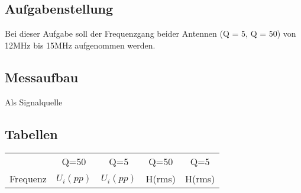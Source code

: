 \documentclass[12pt,a4paper,ngerman]{article}
\begin{document}
\subsection{Aufgabenstellung}
Bei dieser Aufgabe soll der Frequenzgang beider Antennen (Q = 5, Q = 50) von 12MHz bis 15MHz aufgenommen werden.\\

\subsection{Messaufbau}
Als Signalquelle 

\subsection{Tabellen}
\begin{table}[H]
\begin{center}
\begin{tabular}{ |c|c|c|c|c| }
  \hline
     & Q=50 & Q=5 & Q=50 & Q=5\\

    Frequenz & $U_i(pp)$ & $U_i(pp)$ & H(rms) & H(rms)\\


\end{tabular}
\end{center}
\end{table}
\end{document}
